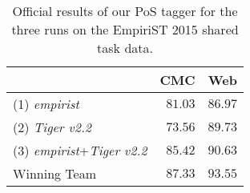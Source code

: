 \documentclass[11pt]{article}
\begin{document}
\begin{table}[h]
\begin{center}
\begin{tabular}{l|r|r}
\hline
\multicolumn{1}{c}{} & \multicolumn{1}{c}{CMC} & \multicolumn{1}{c}{Web} \\ \hline
(1) \emph{empirist}             & $81.03$       & $86.97$ \\ \hline
(2) \emph{Tiger v2.2}           & $73.56$       & $89.73$ \\ \hline
(3) \emph{empirist}+\emph{Tiger v2.2} & $85.42$ & $90.63$ \\ \hline\hline
Winning Team                    & $87.33$       & $93.55$ \\ \hline
\end{tabular}
\end{center}
\caption{\label{tab:results}Official results of our PoS tagger for the three
runs on the EmpiriST 2015 shared task data.
} 
\end{table}


\end{document}
